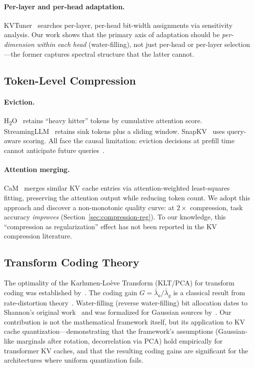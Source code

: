 \paragraph{Per-layer and per-head adaptation.}
KVTuner~\citep{kvtuner2025} searches per-layer, per-head bit-width assignments via sensitivity analysis.
Our work shows that the primary axis of adaptation should be \emph{per-dimension within each head} (water-filling), not just per-head or per-layer selection---the former captures spectral structure that the latter cannot.

\subsection{Token-Level Compression}

\paragraph{Eviction.}
H\textsubscript{2}O~\citep{h2o2023} retains ``heavy hitter'' tokens by cumulative attention score.
StreamingLLM~\citep{streamingllm2024} retains sink tokens plus a sliding window.
SnapKV~\citep{snapkv2024} uses query-aware scoring.
All face the causal limitation: eviction decisions at prefill time cannot anticipate future queries~\citep{paper1}.

\paragraph{Attention merging.}
CaM~\citep{cam2024} merges similar KV cache entries via attention-weighted least-squares fitting, preserving the attention output while reducing token count.
We adopt this approach and discover a non-monotonic quality curve: at $2\times$ compression, task accuracy \emph{improves} (Section~\ref{sec:compression-reg}).
To our knowledge, this ``compression as regularization'' effect has not been reported in the KV compression literature.

\subsection{Transform Coding Theory}

The optimality of the Karhunen-Lo\`eve Transform (KLT/PCA) for transform coding was established by~\citet{goyal2001}. The coding gain $G = \bar{\lambda}_a / \bar{\lambda}_g$ is a classical result from rate-distortion theory~\citep{cover2006,gersho1992}. Water-filling (reverse water-filling) bit allocation dates to Shannon's original work~\citep{shannon1959} and was formalized for Gaussian sources by~\citet{segall1976}.
Our contribution is not the mathematical framework itself, but its application to KV cache quantization---demonstrating that the framework's assumptions (Gaussian-like marginals after rotation, decorrelation via PCA) hold empirically for transformer KV caches, and that the resulting coding gains are significant for the architectures where uniform quantization fails.
